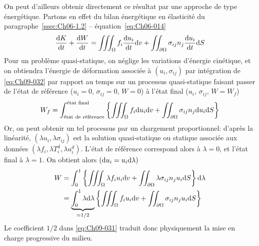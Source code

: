 On peut d'ailleurs obtenir directement ce résultat par une approche de type énergétique.
Partons en effet du bilan énergétique en élasticité du paragraphe~\ref{ssec:Ch06-1.2} -- équation~\eqref{eq:Ch06-014}
\begin{equation}
    \frac{\mathrm{d} K}{\mathrm{d} t} + \frac{\mathrm{d} W}{\mathrm{d} t} = \iiint_{\Omega} f_i \frac{\mathrm{d} u_i}{\mathrm{d} t} \mathrm{d} v + \iint_{\partial \Omega} \sigma_{ij} n_j \frac{\mathrm{d} u_i}{\mathrm{d} t} \mathrm{d} S
    \label{eq:Ch09-032}
\end{equation}
Pour un problème quasi-statique, on néglige les variations d'énergie cinétique, et on obtiendra l'énergie de déformation associée à $\left( u_i, \sigma_{ij} \right)$ par intégration de \eqref{eq:Ch09-032} par rapport au temps sur un processus quasi-statique faisant passer de l'état de référence ($u_i=0$, $\sigma_{ij} = 0$, $W=0$) à l'état final ($u_i$, $\sigma_{ij}$, $W=W_f$)
\begin{displaymath}
    W_f = \int_{\text{état de référence}}^{\text{état final}} \left\{ \iiint_{\Omega} f_i \mathrm{d} u_i \mathrm{d} v + \iint_{\partial \Omega} \sigma_{ij} n_j \mathrm{d} u_i \mathrm{d} S \right\}
\end{displaymath}
Or, on peut obtenir un tel processus par un chargement proportionnel: d'après la linéarité, $\left( \lambda u_i, \lambda \sigma_{ij} \right)$ est la solution quasi-statique ou statique associée aux données $\left( \lambda f_i, \lambda T_i^d, \lambda u_i^d \right)$.
L'état de référence correspond alors à $\lambda=0$, et l'état  final à $\lambda=1$.
On  obtient alors $\left( \mathrm{d} u_i = u_i \mathrm{d} \lambda \right)$
\begin{align*}
    W &= \int_{0}^1 \left\{ \iiint_{\Omega} \lambda f_i u_i \mathrm{d} v + \iint_{\partial \Omega} \lambda \sigma_{ij} n_j u_i \mathrm{d} S \right\} \mathrm{d} \lambda \\
    &= \underbrace{\int_0^1 \lambda \mathrm{d} \lambda}_{=1/2} \left\{ \iiint_{\Omega} f_i u_i \mathrm{d} v + \iint_{\partial \Omega} \sigma_{ij} n_j u_i \mathrm{d} S \right\}
\end{align*}
Le coefficient $1/2$ dans \eqref{eq:Ch09-031} traduit donc physiquement la mise en charge progressive du milieu. 

